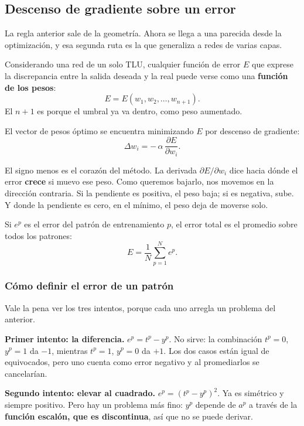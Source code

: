 \documentclass[11pt,letterpaper]{article}
\begin{document}

\subsection*{Descenso de gradiente sobre un error}

La regla anterior sale de la geometría. Ahora se llega a una parecida
desde la optimización, y esa segunda ruta es la que generaliza a
redes de varias capas.

Considerando una red de un solo TLU, cualquier función de error $E$
que exprese la discrepancia entre la salida deseada y la real puede
verse como una \textbf{función de los pesos}:
\[
    E = E(w_1, w_2, \ldots, w_{n+1}) .
\]
El $n+1$ es porque el umbral ya va dentro, como peso aumentado.

El vector de pesos óptimo se encuentra minimizando $E$ por descenso
de gradiente:
\[
    \Delta w_i = -\,\alpha\,\frac{\partial E}{\partial w_i} .
\]

\begin{idea}
  El signo menos es el corazón del método. La derivada
  $\partial E / \partial w_i$ dice hacia dónde el error
  \textbf{crece} si muevo ese peso. Como queremos bajarlo, nos
  movemos en la dirección contraria. Si la pendiente es positiva, el
  peso baja; si es negativa, sube. Y donde la pendiente es cero, en
  el mínimo, el peso deja de moverse solo.
\end{idea}

Si $e^p$ es el error del patrón de entrenamiento $p$, el error total
es el promedio sobre todos los patrones:
\[
    E = \frac{1}{N} \sum_{p=1}^{N} e^p .
\]

\subsubsection*{Cómo definir el error de un patrón}

Vale la pena ver los tres intentos, porque cada uno arregla un
problema del anterior.

\textbf{Primer intento: la diferencia.} $e^p = t^p - y^p$. No sirve:
la combinación $t^p = 0$, $y^p = 1$ da $-1$, mientras
$t^p = 1$, $y^p = 0$ da $+1$. Los dos casos están igual de
equivocados, pero uno cuenta como error negativo y al promediarlos se
cancelarían.

\textbf{Segundo intento: elevar al cuadrado.}
$e^p = (t^p - y^p)^2$. Ya es simétrico y siempre positivo. Pero hay
un problema más fino: $y^p$ depende de $a^p$ a través de la
\textbf{función escalón, que es discontinua}, así que no se puede
derivar.
\end{document}
